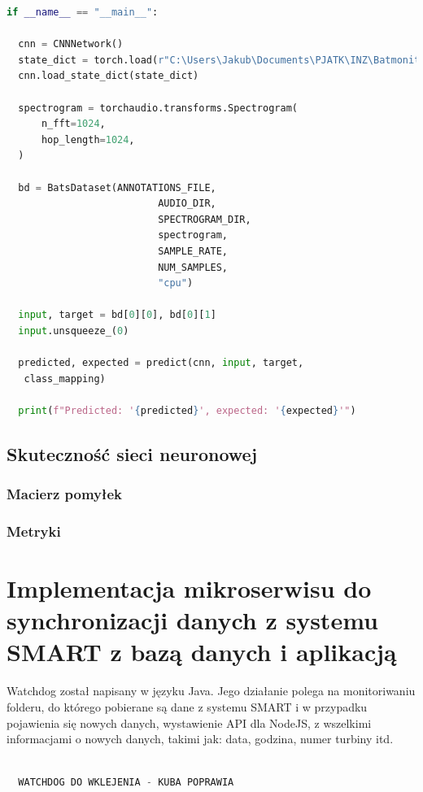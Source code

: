 \documentclass{sprz}
\begin{document}
\begin{lstlisting}[language=Python,caption={Implementacja modułu do trenowania sieci}, label={lst:train}]
  if __name__ == "__main__":

  cnn = CNNNetwork()
  state_dict = torch.load(r"C:\Users\Jakub\Documents\PJATK\INZ\Batmonit_model\feedforwardnet.pth", map_location=torch.device('cpu'))
  cnn.load_state_dict(state_dict)

  spectrogram = torchaudio.transforms.Spectrogram(
      n_fft=1024,
      hop_length=1024,
  )

  bd = BatsDataset(ANNOTATIONS_FILE,
                          AUDIO_DIR,
                          SPECTROGRAM_DIR, 
                          spectrogram, 
                          SAMPLE_RATE,
                          NUM_SAMPLES,
                          "cpu")

  input, target = bd[0][0], bd[0][1]
  input.unsqueeze_(0)

  predicted, expected = predict(cnn, input, target,
   class_mapping)

  print(f"Predicted: '{predicted}', expected: '{expected}'")
\end{lstlisting}

\section{Skuteczność sieci neuronowej}

\subsection{Macierz pomyłek}

\subsection{Metryki}

\chapter{Implementacja mikroserwisu do synchronizacji danych z systemu SMART z bazą danych i aplikacją}

Watchdog został napisany w języku Java. Jego działanie polega na monitoriwaniu folderu, do którego pobierane są dane z systemu SMART i w przypadku pojawienia się nowych danych, wystawienie API dla NodeJS, z wszelkimi informacjami o nowych danych, takimi jak: data, godzina, numer turbiny itd. 

\begin{lstlisting}[language=Java,caption={Implementacja watchdoga do synchronizacji dźwięków z zystemu SMART z bazą danych i aplikacją}, label={lst:watchdog}]

  WATCHDOG DO WKLEJENIA - KUBA POPRAWIA

\end{lstlisting}
\clearpage
\end{document}
